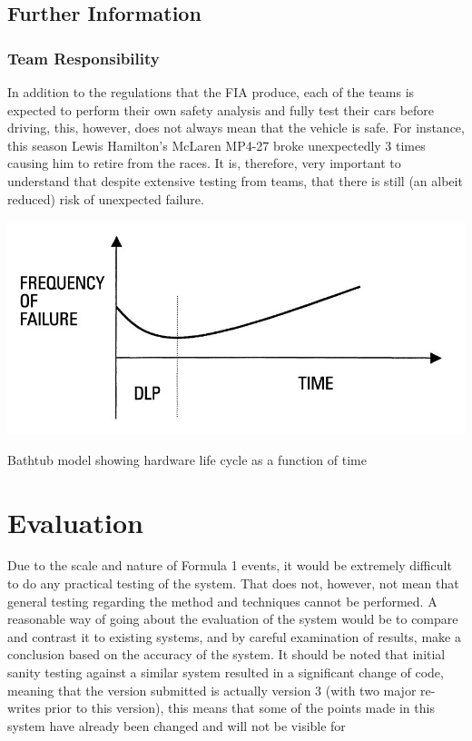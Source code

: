 \documentclass[12pt]{article} %
\begin{document}


\subsection{Further Information} %
\subsubsection{Team Responsibility}
In addition to the regulations that the FIA produce, each of the teams is expected to perform their own safety analysis and fully test their cars before driving, this, however, does not always mean that the vehicle is safe. For instance, this season Lewis Hamilton's McLaren MP4-27 broke unexpectedly 3 times causing him to retire from the races. It is, therefore, very important to understand that despite extensive testing from teams, that there is still (an albeit reduced) risk of unexpected failure.

\begin{center}
\includegraphics[width=0.7\linewidth]{bathtub}
\parbox{10cm}{\caption{Bathtub model showing hardware life cycle as a function of time}}
\end{center}

\section{Evaluation}

Due to the scale and nature of Formula 1 events, it would be extremely difficult to do any practical testing of the system. That does not, however, not mean that general testing regarding the method and techniques cannot be performed. A reasonable way of going about the evaluation of the system would be to compare and contrast it to existing systems, and by careful examination of results, make a conclusion based on the accuracy of the system. It should be noted that initial sanity testing against a similar system resulted in a significant change of code, meaning that the version submitted is actually version 3 (with two major re-writes prior to this version), this means that some of the points made in this system have already been changed and will not be visible for 
\end{document}
